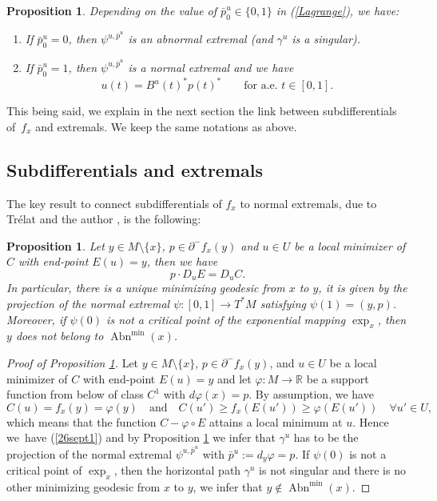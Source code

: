 \documentclass[JEP,XML,SOM,Unicode,NoFloatCountersInSection,published]{cedram}
\newenvironment{enumeratei}
{\bgroup\def\theenumi{\roman{enumi}}\def\theenumii{\arabic{enumii}}\begin{enumerate}}
{\end{enumerate}\egroup}
\DeclareMathOperator{\Abn}{Abn}
\newcommand\R{\mathbb R}
\newtheorem{proposition}[theorem]{Proposition}
\theoremstyle{definition}
\begin{document}
\begin{proposition}\label{PROPp0}
Depending on the value of $\bar{p}_0^u \in \{0,1\}$ in (\ref{Lagrange}), we have:
\begin{enumeratei}
\item\label{PROPp0i}
If $\bar{p}_0^u=0$, then $\psi^{u,\bar{p}^u}$ is an abnormal extremal (and $\gamma^{u}$ is a singular).
\item\label{PROPp0ii}
If $\bar{p}_0^u=1$, then $\psi^{u,\bar{p}^u}$ is a normal extremal and we have
\[
u(t) = B^u(t)^{*} p(t)^* \qquad \text{for a.e. } t \in [0,1].
\]
\end{enumeratei}
\end{proposition}

This being said, we explain in the next section the link between subdifferentials of~$f_x$ and extremals. We keep the same notations as above.

\subsection{Subdifferentials and extremals}

The key result to connect subdifferentials of $f_x$ to normal extremals, due to Trélat and the author \cite{rt05}, is the following:

\begin{proposition}\label{PROPsub1}
Let $y\in M\setminus \{x\}$, $p\in \partial^- f_x(y)$ and $u\in U$ be a local minimizer of $C$ with end-point $E(u)=y$, then we have
\begin{equation}\label{26sept1}
p\cdot D_{u}E = D_{u}C.
\end{equation}
In particular, there is a unique minimizing geodesic from $x$ to $y$, it is given by the projection of the normal extremal $\psi:[0,1] \to T^*M$ satisfying $\psi(1)=(y,p)$. Moreover, if $\psi(0)$ is not a critical point of the exponential mapping $\exp_x$, then $y$ does not belong to $\Abn^{\min}(x)$.
\end{proposition}

\begin{proof}[Proof of Proposition \ref{PROPsub1}]
Let $y\in M\setminus \{x\}$, $p\in \partial^- f_x(y)$, and $u\in U$ be a local minimizer of $C$ with end-point $E(u)=y$ and let $\varphi:M\to \R$ be a support function from below of class $C^1$ with $d\varphi(x)=p$. By assumption, we have
\[
C(u) = f_x(y)=\varphi(y) \quad \text{and} \quad C(u') \geq f_x\left(E(u')\right) \geq \varphi \left(E(u')\right) \quad \forall u'\in U,
\]
which means that the function $C-\varphi\circ E$ attains a local minimum at $u$. Hence we~have (\ref{26sept1}) and by Proposition \ref{PROPp0} we infer that $\gamma^u$ has to be the projection of the normal extremal $\psi^{u,\bar{p}^{u}}$ with $\bar{p}^{u}:=d_{y}\varphi =p$. If $\psi(0)$ is not a critical point of $\exp_x$, then the horizontal path $\gamma^u$ is not singular and there is no other minimizing geodesic from $x$ to $y$, we infer that $y\notin \Abn^{\min}(x)$.
\end{proof}
\end{document}
